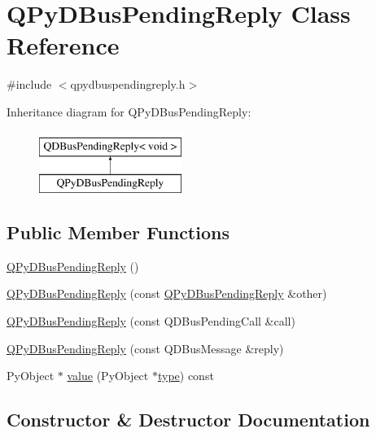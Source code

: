 \hypertarget{classQPyDBusPendingReply}{}\section{Q\+Py\+D\+Bus\+Pending\+Reply Class Reference}
\label{classQPyDBusPendingReply}


{\ttfamily \#include $<$qpydbuspendingreply.\+h$>$}

Inheritance diagram for Q\+Py\+D\+Bus\+Pending\+Reply\+:\begin{figure}[H]
\begin{center}
\leavevmode
\includegraphics[height=2.000000cm]{classQPyDBusPendingReply}
\end{center}
\end{figure}
\subsection*{Public Member Functions}
\begin{DoxyCompactItemize}
\item 
\hyperlink{classQPyDBusPendingReply_a8773aef0bb2446078d54284318a6db92}{Q\+Py\+D\+Bus\+Pending\+Reply} ()
\item 
\hyperlink{classQPyDBusPendingReply_ae3ffa466bd6fdb63006f76d1d7f416ab}{Q\+Py\+D\+Bus\+Pending\+Reply} (const \hyperlink{classQPyDBusPendingReply}{Q\+Py\+D\+Bus\+Pending\+Reply} \&other)
\item 
\hyperlink{classQPyDBusPendingReply_a0e91b25aeefecc32c4cd58a20ba21471}{Q\+Py\+D\+Bus\+Pending\+Reply} (const Q\+D\+Bus\+Pending\+Call \&call)
\item 
\hyperlink{classQPyDBusPendingReply_aec39d8894ba063cd17c3472d62c1cea0}{Q\+Py\+D\+Bus\+Pending\+Reply} (const Q\+D\+Bus\+Message \&reply)
\item 
Py\+Object $\ast$ \hyperlink{classQPyDBusPendingReply_a0fedb353dd29be0c0c8f338732264966}{value} (Py\+Object $\ast$\hyperlink{fftw__dct_8c_a7aead736a07eaf25623ad7bfa1f0ee2d}{type}) const 
\end{DoxyCompactItemize}


\subsection{Constructor \& Destructor Documentation}
\hypertarget{classQPyDBusPendingReply_a8773aef0bb2446078d54284318a6db92}{}
